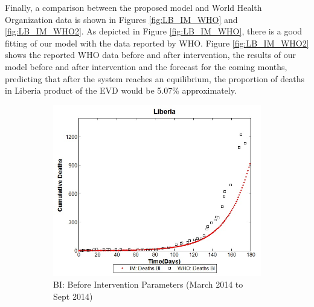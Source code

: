 
\noindent Finally, a comparison between the proposed model and World Health Organization data is shown in Figures \ref{fig:LB_IM_WHO} and \ref{fig:LB_IM_WHO2}. As depicted in Figure \ref{fig:LB_IM_WHO}, there is a good fitting of our model with the data reported by WHO. Figure \ref{fig:LB_IM_WHO2} shows  the reported WHO data before and after intervention, the results of our model before and after intervention and the forecast for the coming months, predicting that after the system reaches an equilibrium, the proportion of deaths in Liberia product of the EVD would be 5.07\% approximately.



\begin{figure}[h!]
 \centering 
 \begin{subfigure}[b]{0.38\textwidth}
  \includegraphics[width=\textwidth]{LB_BI_SD_WHO_IM} \caption{BI: Before Intervention Parameters (March 2014  to Sept 2014)} \label{fig:LB_BI_SD_WHO_IM} \end{subfigure}
 \hspace{.1cm}
\begin{subfigure}[b]{0.38\textwidth}

\end{subfigure}
\end{figure}
